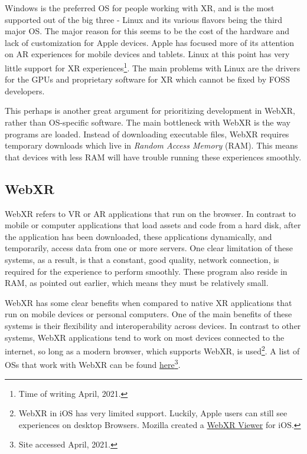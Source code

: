 Windows is the preferred OS for people working with XR, and is the most supported out of the big three - Linux and its various flavors being the third major OS. The major reason for this seems to be the cost of the hardware and lack of customization for Apple devices. Apple has focused more of its attention on AR experiences for mobile devices and tablets. Linux at this point has very little support for XR experiences\footnote{Time of writing April, 2021.}. The main problems with Linux are the drivers for the GPUs and proprietary software for XR which cannot be fixed by FOSS developers. 

This perhaps is another great argument for prioritizing development in WebXR, rather than OS-specific software. The main bottleneck with WebXR is the way programs are loaded. Instead of downloading executable files, WebXR requires temporary downloads which live in \textit{Random Access Memory} (RAM). This means that devices with less RAM will have trouble running these experiences smoothly. 


\subsection{WebXR}

WebXR refers to VR or AR applications that run on the browser. In contrast to mobile or computer applications that load assets and code from a hard disk, after the application has been downloaded, these applications dynamically, and temporarily, access data from one or more servers. One clear limitation of these systems, as a result, is that a constant, good quality, network connection, is required for the experience to perform smoothly. These program also reside in RAM, as pointed out earlier, which means they must be relatively small. 

WebXR has some clear benefits when compared to native XR applications that run on mobile devices or personal computers. One of the main benefits of these systems is their flexibility and interoperability across devices. In contrast to other systems, WebXR applications tend to work on most devices connected to the internet, so long as a modern browser, which supports WebXR, is used\footnote{WebXR in iOS has very limited support. Luckily, Apple users can still see experiences on desktop Browsers. Mozilla created a \href{https://webxr-ios.webxrexperiments.com/}{WebXR Viewer} for iOS.}. A list of OSs that work with WebXR can be found \href{https://webvr.rocks/}{here}\footnote{Site accessed April, 2021.}. 


